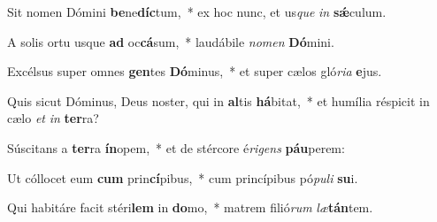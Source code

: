 \item Sit nomen Dómini \textbf{be}ne\textbf{díc}tum,~* ex hoc nunc, et us\textit{que} \textit{in} \textbf{sǽ}culum.
\item A solis ortu usque \textbf{ad} oc\textbf{cá}sum,~* laudábile \textit{no}\textit{men} \textbf{Dó}mini.
\item Excélsus super omnes \textbf{gen}tes \textbf{Dó}minus,~* et super cælos gló\textit{ri}\textit{a} \textbf{e}jus.
\item Quis sicut Dóminus, Deus noster, qui in \textbf{al}tis \textbf{há}bitat,~* et humília réspicit in cælo \textit{et} \textit{in} \textbf{ter}ra?
\item Súscitans a \textbf{ter}ra \textbf{ín}opem,~* et de stércore é\textit{ri}\textit{gens} \textbf{páu}perem:
\item Ut cóllocet eum \textbf{cum} prin\textbf{cí}pibus,~* cum princípibus pó\textit{pu}\textit{li} \textbf{su}i.
\item Qui habitáre facit stéri\textbf{lem} in \textbf{do}mo,~* matrem filió\textit{rum} \textit{læ}\textbf{tán}tem.
